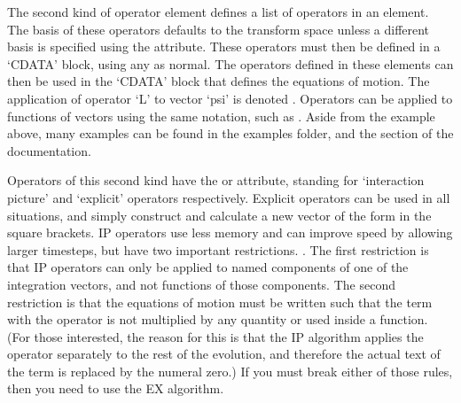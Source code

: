\documentclass[letterpaper,10pt,english]{sphinxmanual}
\begin{document}
\begin{sphinxVerbatim}[commandchars=\\\{\}]
 
  \PYG{c+cp}{\PYGZlt{}![CDATA[}
    
  \PYG{c+cp}{]]\PYGZgt{}}
\end{sphinxVerbatim}
\label{\detokenize{reference_elements:operatornameselement}}
\sphinxAtStartPar
The second kind of operator element defines a list of operators in an  element.  The basis of these operators defaults to the transform space unless a different basis is specified using the  attribute.  These operators must then be defined in a ‘CDATA’ block, using any {\hyperref[\detokenize{reference_elements:dependencies}]{}} as normal.  The operators defined in these elements can then be used in the ‘CDATA’ block that defines the equations of motion.  The application of operator ‘L’ to vector ‘psi’ is denoted .  Operators can be applied to functions of vectors using the same notation, such as .  Aside from the example above, many examples can be found in the examples folder, and the {\hyperref[\detokenize{worked_examples:workedexamples}]{}} section of the documentation.

\ignorespaces 
{}\ignorespaces 
\sphinxAtStartPar
Operators of this second kind have the  or  attribute, standing for ‘interaction picture’ and ‘explicit’ operators respectively.  Explicit operators can be used in all situations, and simply construct and calculate a new vector of the form in the square brackets.  IP operators use less memory and can improve speed by allowing larger timesteps, but have two important restrictions.  .  The first restriction is that IP operators can only be applied to named components of one of the integration vectors, and not functions of those components.  The second restriction is that the equations of motion must be written such that the term with the operator is not multiplied by any quantity or used inside a function.  (For those interested, the reason for this is that the IP algorithm applies the operator separately to the rest of the evolution, and therefore the actual text of the  term is replaced by the numeral zero.)  If you must break either of those rules, then you need to use the EX algorithm.
\end{document}
